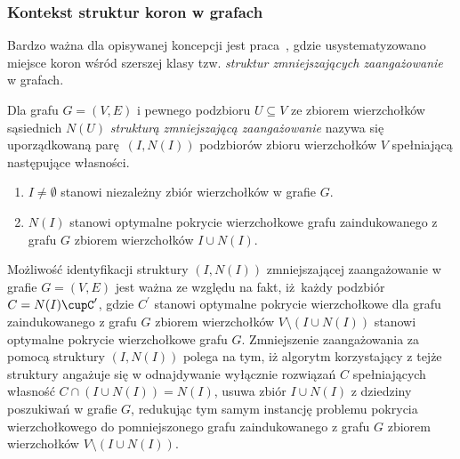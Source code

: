 \subsubsection{\textbf{Kontekst struktur koron w grafach}}
\label{sss_kernelization_crown_context}
\par{
  Bardzo ważna dla opisywanej koncepcji jest praca~\cite{chlebik:crown}, gdzie usystematyzowano miejsce koron wśród szerszej klasy tzw. \emph{struktur zmniejszających zaangażowanie} w grafach.
  \begin{definition}
    Dla grafu $G=(V, E)$ i pewnego podzbioru $U \subseteq V$ ze zbiorem wierzchołków sąsiednich $N(U)$ \emph{strukturą zmniejszającą zaangażowanie} nazywa się uporządkowaną parę $(I, N(I))$ podzbiorów zbioru wierzchołków $V$ spełniającą następujące własności.
    \begin{enumerate}
      \item $I \neq \emptyset$ stanowi niezależny zbiór wierzchołków w grafie $G$.
      \item $N(I)$ stanowi optymalne pokrycie wierzchołkowe grafu zaindukowanego z grafu $G$ zbiorem wierzchołków $I \cup N(I)$.
    \end{enumerate}
  \end{definition}
  Możliwość identyfikacji struktury $(I, N(I))$ zmniejszającej zaangażowanie w grafie $G=(V, E)$ jest ważna ze względu na fakt, iż każdy podzbiór $C=N(I)\cupC^\prime$, gdzie $C^\prime$ stanowi optymalne pokrycie wierzchołkowe dla grafu zaindukowanego z grafu $G$ zbiorem wierzchołków $V \setminus (I\cup N(I))$ stanowi optymalne pokrycie wierzchołkowe grafu $G$.
  Zmniejszenie zaangażowania za pomocą struktury $(I, N(I))$ polega na tym, iż algorytm korzystający z tejże struktury angażuje się w odnajdywanie wyłącznie rozwiązań $C$ spełniających własność $C \cap (I \cup N(I)) = N(I)$, usuwa zbiór $I \cup N(I)$ z dziedziny poszukiwań w grafie $G$, redukując tym samym instancję problemu pokrycia wierzchołkowego do pomniejszonego grafu zaindukowanego z grafu $G$ zbiorem wierzchołków $V \setminus (I \cup N(I))$.

}
